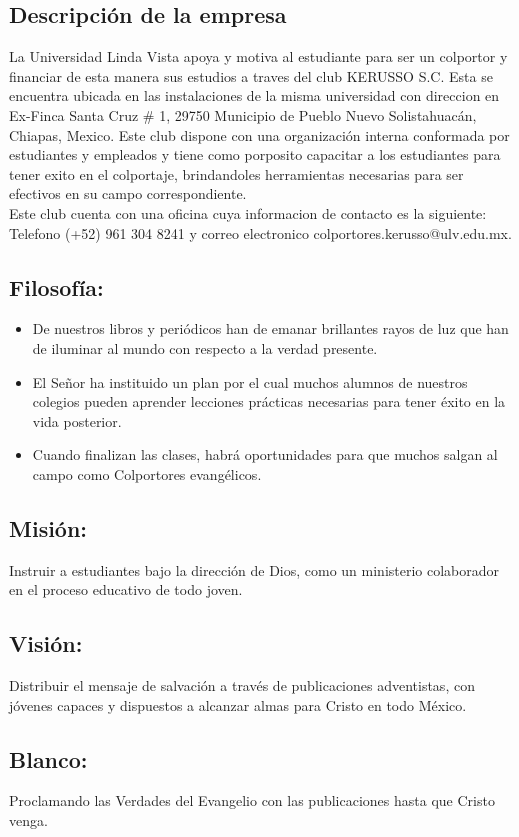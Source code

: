 \documentclass[runningheads]{llncs}
\begin{document}
\subsection{Descripción de la empresa}

La Universidad Linda Vista apoya y motiva al estudiante para ser un colportor y financiar de esta manera sus estudios a traves del club KERUSSO S.C. Esta se encuentra ubicada en las instalaciones de la misma universidad con direccion en Ex-Finca Santa Cruz \# 1, 29750 Municipio de Pueblo Nuevo Solistahuacán, Chiapas, Mexico. Este club dispone con una organización interna conformada por estudiantes y empleados y tiene como porposito capacitar a los estudiantes para tener exito en el colportaje, brindandoles herramientas necesarias para ser efectivos en su campo correspondiente.\\
Este club cuenta con una oficina cuya informacion de contacto es la siguiente: Telefono (+52) 961 304 8241 y correo electronico colportores.kerusso@ulv.edu.mx.

\subsection*{Filosofía:}
\begin{itemize}
    \item De nuestros libros y periódicos han de emanar brillantes rayos de luz que han de iluminar al mundo con respecto a la verdad presente.
    \item El Señor ha instituido un plan por el cual muchos alumnos de nuestros colegios pueden aprender lecciones prácticas necesarias para tener éxito en la vida posterior.
    \item Cuando finalizan las clases, habrá oportunidades para que muchos salgan al campo como Colportores evangélicos.
\end{itemize}
\subsection*{Misión: }
Instruir a estudiantes bajo la dirección de Dios, como un ministerio colaborador en el proceso educativo de todo joven.
\subsection*{Visión: }
Distribuir el mensaje de salvación a través de publicaciones adventistas, con jóvenes capaces y dispuestos a alcanzar almas para Cristo en todo México.
\subsection*{Blanco: }
Proclamando las Verdades del Evangelio con las publicaciones hasta que Cristo venga.
\end{document}
